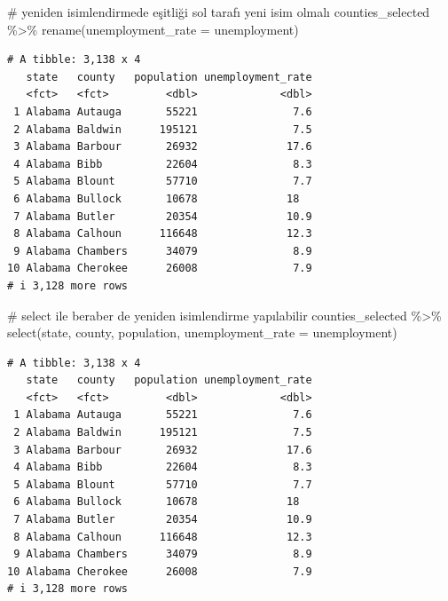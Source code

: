 \documentclass[
  letterpaper,
  DIV=11,
  numbers=noendperiod]{scrreprt}
\newenvironment{Shaded}{\begin{snugshade}}{\end{snugshade}}
\newcommand{\AttributeTok}[1]{\textcolor[rgb]{0.40,0.45,0.13}{#1}}
\newcommand{\CommentTok}[1]{\textcolor[rgb]{0.37,0.37,0.37}{#1}}
\newcommand{\FunctionTok}[1]{\textcolor[rgb]{0.28,0.35,0.67}{#1}}
\newcommand{\NormalTok}[1]{\textcolor[rgb]{0.00,0.23,0.31}{#1}}
\newcommand{\SpecialCharTok}[1]{\textcolor[rgb]{0.37,0.37,0.37}{#1}}
\begin{document}
\begin{Shaded}
\begin{Highlighting}[]
\CommentTok{\# yeniden isimlendirmede eşitliği sol tarafı yeni isim olmalı}
\NormalTok{counties\_selected }\SpecialCharTok{\%\textgreater{}\%}
\FunctionTok{rename}\NormalTok{(}\AttributeTok{unemployment\_rate =}\NormalTok{ unemployment)}
\end{Highlighting}
\end{Shaded}

\begin{verbatim}
# A tibble: 3,138 x 4
   state   county   population unemployment_rate
   <fct>   <fct>         <dbl>             <dbl>
 1 Alabama Autauga       55221               7.6
 2 Alabama Baldwin      195121               7.5
 3 Alabama Barbour       26932              17.6
 4 Alabama Bibb          22604               8.3
 5 Alabama Blount        57710               7.7
 6 Alabama Bullock       10678              18  
 7 Alabama Butler        20354              10.9
 8 Alabama Calhoun      116648              12.3
 9 Alabama Chambers      34079               8.9
10 Alabama Cherokee      26008               7.9
# i 3,128 more rows
\end{verbatim}

\begin{Shaded}
\begin{Highlighting}[]
\CommentTok{\# select ile beraber de yeniden isimlendirme yapılabilir}
\NormalTok{counties\_selected }\SpecialCharTok{\%\textgreater{}\%}
\FunctionTok{select}\NormalTok{(state, county, population, }\AttributeTok{unemployment\_rate =}\NormalTok{ unemployment)}
\end{Highlighting}
\end{Shaded}

\begin{verbatim}
# A tibble: 3,138 x 4
   state   county   population unemployment_rate
   <fct>   <fct>         <dbl>             <dbl>
 1 Alabama Autauga       55221               7.6
 2 Alabama Baldwin      195121               7.5
 3 Alabama Barbour       26932              17.6
 4 Alabama Bibb          22604               8.3
 5 Alabama Blount        57710               7.7
 6 Alabama Bullock       10678              18  
 7 Alabama Butler        20354              10.9
 8 Alabama Calhoun      116648              12.3
 9 Alabama Chambers      34079               8.9
10 Alabama Cherokee      26008               7.9
# i 3,128 more rows
\end{verbatim}
\end{document}
